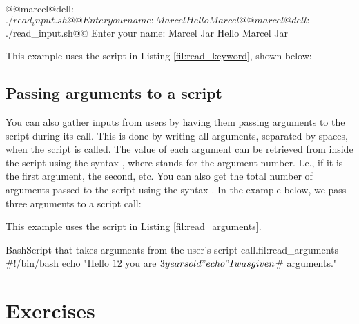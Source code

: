 \begin{command_line}[Bash]
@@marcel@dell:~$./read_input.sh@@
Enter your name:
Marcel
Hello Marcel
@@marcel@dell:~$./read_input.sh@@
Enter your name:
Marcel Jar
Hello Marcel Jar
\end{command_line}
This example uses the script  in Listing \ref{fil:read_keyword}, shown below:

\subsection{Passing arguments to a script}
\label{sec:passing_arguments}

You can also gather inputs from users by having them passing arguments to the script during its call. This is done by writing all arguments, separated by spaces, when the script is called. The value of each argument can be retrieved from inside the script using the syntax , where  stands for the argument number. I.e., if it is the first argument, the second, etc. You can also get the total number of arguments passed to the script using the syntax \mycommand{\$\#}. In the example below, we pass three arguments to a script call:

This example uses the script  in Listing \ref{fil:read_arguments}.

\begin{source_code_float}{Bash}{Script that takes arguments from the user's script call.}{fil:read_arguments}
#!/bin/bash
echo "Hello $1 $2 you are $3 years old"
echo "I was given $# arguments."
\end{source_code_float}


\section*{Exercises}

